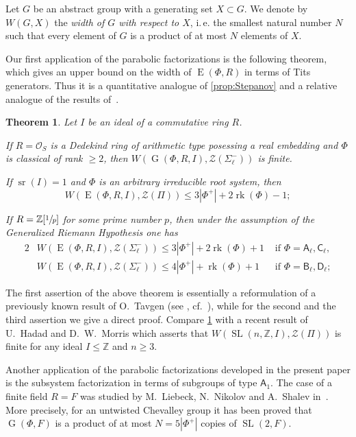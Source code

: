 \documentclass[oneside, 12pt]{amsart}
\theoremstyle{plain}
\newtheorem{thm}{Theorem}
\numberwithin{equation}{section}
\numberwithin{lemma}{section}
\theoremstyle{definition}
\theoremstyle{remark}
\DeclareMathOperator{\G}{G}
\DeclareMathOperator{\SL}{SL}
\DeclareMathOperator{\E}{E}
\DeclareMathOperator{\sr}{sr}
\DeclareMathOperator{\rk}{rk}
\newcommand{\rA}{\mathsf{A}}
\newcommand{\rB}{\mathsf{B}}
\newcommand{\rC}{\mathsf{C}}
\newcommand{\rD}{\mathsf{D}}
\begin{document}
Let $G$ be an abstract group with a generating set $X \subset G$. 
We denote by $W(G, X)$ the \emph{width of $G$ with respect to $X$}, i.\,e. the smallest natural number $N$ such that every element of $G$ is a product of at most $N$ elements of $X$.

Our first application of the parabolic factorizations is the following theorem, which gives an upper bound on the width of $\E(\Phi, R)$ in terms of Tits generators. Thus it is a quantitative analogue of \cref{prop:Stepanov}
and a relative analogue of the results of~\cite{Tavgen91, VseUnitrZ1p, VavSmSuUnitrEng}.
\begin{thm}\label{thm:width} Let $I$ be an ideal of a commutative ring $R$.
\begin{thmlist}
\item If $R=\mathcal{O}_S$ is a Dedekind ring of arithmetic type posessing a real embedding and $\Phi$ is classical of rank $\geqslant2$, then 
$W(\G(\Phi, R, I), \mathcal{Z}(\Sigma_\ell^-))$ is finite.
\item If $\sr(I) = 1$ and $\Phi$ is an arbitrary irreducible root system, then 
\[W(\E(\Phi, R, I), \mathcal{Z}(\Pi))\leqslant 3|\Phi^+|+2\rk(\Phi)-1;\]
\item If $R = \mathbb{Z}[\sfrac{1}{p}]$ for some prime number $p$, then under the assumption of the Generalized Riemann Hypothesis one has
\begin{alignat*}{2}
& W(\E(\Phi, R, I), \mathcal{Z}(\Sigma_\ell^-))\leqslant 3|\Phi^+| + 2\rk(\Phi) + 1 & \text{ if } \Phi=\rA_\ell, \rC_\ell, \\
& W(\E(\Phi, R, I), \mathcal{Z}(\Sigma_\ell^-))\leqslant 4|\Phi^+| + \rk(\Phi) + 1 & \text{ if } \Phi=\rB_\ell, \rD_\ell;
\end{alignat*}
\end{thmlist}
\end{thm}
The first assertion of the above theorem is essentially a reformulation of a previously known result of O.~Tavgen (see \cite{TavgenThesis}, cf.~\cite{Mo07}), 
while for the second and the third assertion we give a direct proof.
Compare \cref{thm:width} with a recent result of U.~Hadad and D.~W.~Morris \cite[Theorem~1.6]{Ha12} which asserts that 
$W(\SL(n, \mathbb{Z}, I), \mathcal{Z}(\Pi))$ is finite for any ideal $I \leq \mathbb{Z}$ and $n \geq 3$.

Another application of the parabolic factorizations developed in the present paper is the subsystem factorization in terms of subgroups of type $\rA_1$.
The case of a finite field $R=F$ was studied by M.~Liebeck, N.~Nikolov and A.~Shalev in~\cite{LNS11}.
More precisely, for an untwisted Chevalley group it has been proved that $\G(\Phi, F)$ is a product of at most $N=5|\Phi^+|$ copies of $\SL(2, F)$.
\end{document}
